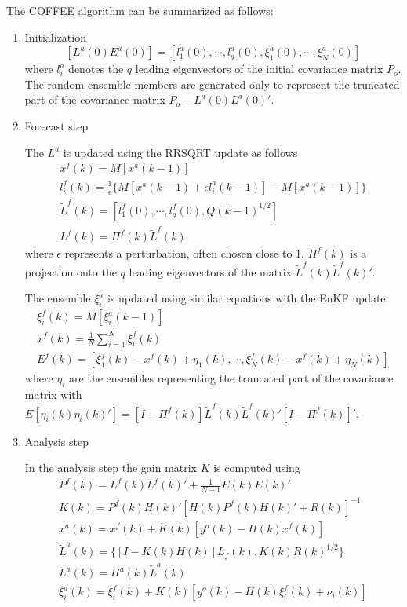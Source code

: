 The COFFEE algorithm can be summarized as follows:
\begin{enumerate}
\item Initialization
  \begin{equation}
    \label{eq.COFFEE_initialmatrix}
          [L^a(0) E^a(0)]=[l_1^a(0),\cdots,l_q^a(0),\xi_1^a(0),\cdots,\xi_N^a(0)]
  \end{equation}
where $l_i^a$ denotes the $q$ leading eigenvectors of the initial covariance
matrix $P_o$. The random ensemble members are generated only to represent the
truncated part of the covariance matrix $P_o-L^a(0)L^a(0)'$.
\item Forecast step

The $L^a$ is updated using the RRSQRT update as follows
\begin{eqnarray}
  x^f(k)=M[x^a(k-1)] \\
  l^f_i(k)=\frac{1}{\epsilon} \{ M[x^a(k-1)+ \epsilon  l^a_i(k-1)]-M[x^a(k-1)] \} \label{eq.COFFEE_lf} \\
  \tilde{L}^f(k)=[l_1^f(0),\cdots,l_q^f(0),Q(k-1)^{1/2}] \label{eq.COFFEE_Lf}\\
  L^f(k)=\Pi^f(k)\tilde{L}^f(k)
\end{eqnarray}
where $\epsilon$ represents a perturbation, often chosen close to 1, $\Pi^f(k)$
is a projection onto the $q$ leading eigenvectors of the matrix
$\tilde{L}^f(k)\tilde{L}^f(k)'$.

The ensemble $\xi_i^a$ is updated using similar equations with the EnKF update
\begin{eqnarray}
  \xi_i^f(k)=M[\xi_i^a(k-1)] \\
  x^f(k)=\frac{1}{N} \sum_{i=1}^N \xi_i^f(k) \\
  E^f(k)=[\xi_1^f(k)-x^f(k)+\eta_1(k),\cdots,\xi_N^f(k)-x^f(k)+\eta_N(k)]
\end{eqnarray}
where $\eta_i$ are the ensembles representing the truncated part of the
covariance matrix with $E[\eta_i(k)\eta_i(k)']=[I-\Pi^f(k)]\tilde{L}^f(k)
\tilde{L}^f(k)'[I-\Pi^f(k)]'$.

\item Analysis step

In the analysis step the gain matrix $K$ is computed using
\begin{eqnarray}
  P^f(k)=L^f(k)L^f(k)' + \frac{1}{N-1}E(k)E(k)' \\
  K(k) = P^f(k)H(k)'[H(k)P^f(k)H(k)'+R(k)]^{-1} \\
  x^a(k) = x^f(k) + K(k) [y^o(k) - H(k) x^f(k)] \\
  \tilde{L}^a(k)=\{[I - K(k) H(k)] L_f(k), K(k) R(k)^{1/2}\} \label{eq.COFFEE_La} \\
  L^a(k)=\Pi^a(k)\tilde{L}^a(k) \\
  \xi^a_i(k) = \xi^f_i(k) + K(k) [y^o(k) - H(k) \xi^f_i(k) + \nu_i(k)]
\end{eqnarray}
\end{enumerate}


